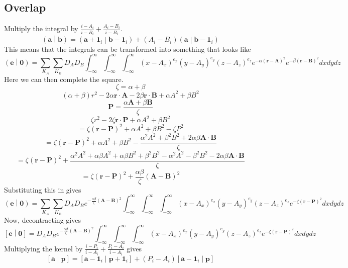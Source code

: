 \documentclass[12pt]{article}
\begin{document}
\subsection*{Overlap}
Multiply the integral by $\frac{i - A_i}{i - B_i} + \frac{A_i - B_i}{i - B_i}$.
$$\left(\mathbf{a}\middle|\mathbf{b}\right) = \left(\mathbf{a} + \mathbf{1}_i\middle|\mathbf{b} - \mathbf{1}_i\right) + \left(A_i - B_i\right)\left(\mathbf{a}\middle|\mathbf{b} - \mathbf{1}_i\right)$$
This means that the integrals can be transformed into something that looks like
$$\left(\mathbf{e}\middle|\mathbf{0}\right) = \sum_{K_A}\sum_{K_B} D_AD_B \int_{-\infty}^\infty \int_{-\infty}^\infty \int_{-\infty}^\infty \left(x - A_x\right)^{e_x} \left(y - A_y\right)^{e_y} \left(z - A_z\right)^{e_z} e^{-\alpha\left(\mathbf{r} - \mathbf{A}\right)^2} e^{-\beta\left(\mathbf{r} - \mathbf{B}\right)^2} dx dy dz$$
Here we can then complete the square.
$$\zeta = \alpha + \beta$$
$$\left(\alpha + \beta\right) r^2 - 2\alpha \mathbf{r}\cdot\mathbf{A} - 2\beta \mathbf{r} \cdot\mathbf{B} + \alpha A^2 + \beta B^2$$
$$\mathbf{P} = \frac{\alpha\mathbf{A} + \beta \mathbf{B}}{\zeta}$$
$$\zeta r^2 - 2\zeta \mathbf{r}\cdot\mathbf{P} + \alpha A^2 + \beta B^2$$
$$= \zeta \left(\mathbf{r} - \mathbf{P}\right)^2 + \alpha A^2 + \beta B^2 - \zeta P^2$$
$$= \zeta \left(\mathbf{r} - \mathbf{P}\right)^2 + \alpha A^2 + \beta B^2 - \frac{\alpha^2 A^2 + \beta^2 B^2 + 2\alpha\beta\mathbf{A}\cdot\mathbf{B}}{\zeta}$$
$$= \zeta \left(\mathbf{r} - \mathbf{P}\right)^2 + \frac{\alpha^2 A^2 + \alpha\beta A^2 + \alpha\beta B^2 + \beta^2 B^2 - \alpha^2 A^2 - \beta^2 B^2 - 2\alpha\beta\mathbf{A}\cdot\mathbf{B}}{\zeta}$$
$$= \zeta \left(\mathbf{r} - \mathbf{P}\right)^2 + \frac{\alpha\beta}{\zeta}\left(\mathbf{A} - \mathbf{B}\right)^2$$
Substituting this in gives
$$\left(\mathbf{e}\middle|\mathbf{0}\right) = \sum_{K_A}\sum_{K_B} D_AD_B e^{-\frac{\alpha\beta}{\zeta}\left(\mathbf{A} - \mathbf{B}\right)^2} \int_{-\infty}^\infty \int_{-\infty}^\infty \int_{-\infty}^\infty \left(x - A_x\right)^{e_x} \left(y - A_y\right)^{e_y} \left(z - A_z\right)^{e_z} e^{-\zeta\left(\mathbf{r} - \mathbf{P}\right)^2} dxdydz$$
Now, decontracting gives
$$\left[\mathbf{e}\middle|\mathbf{0}\right] = D_AD_B e^{-\frac{\alpha\beta}{\zeta}\left(\mathbf{A} - \mathbf{B}\right)^2} \int_{-\infty}^\infty \int_{-\infty}^\infty \int_{-\infty}^\infty \left(x - A_x\right)^{e_x} \left(y - A_y\right)^{e_y} \left(z - A_z\right)^{e_z} e^{-\zeta\left(\mathbf{r} - \mathbf{P}\right)^2} dxdydz$$
Multiplying the kernel by $\frac{i - P_i}{i - A_i} + \frac{P_i - A_i}{i - A_i}$ gives
$$\left[\mathbf{a}\middle|\mathbf{p}\right] = \left[\mathbf{a} - \mathbf{1}_i\middle|\mathbf{p} + \mathbf{1}_i\right] + \left(P_i - A_i\right)\left[\mathbf{a} - \mathbf{1}_i\middle|\mathbf{p}\right]$$
\end{document}
